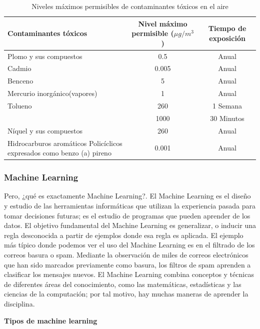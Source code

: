 \begin{table}[h]
	\begin{center}
		\begin{tabular}{| p{4cm} | c | c |}
			\hline
			\rowcolor{lightgray}
			Contaminantes tóxicos 			& Nivel máximo permisible ($ \mu g/m^3 $) 	& Tiempo de exposición	\\ \hline
			Plomo y sus compuestos			& 0.5 		& Anual		\\ \hline
			Cadmio							& 0.005 	& Anual 	\\ \hline
			Benceno							& 5 		& Anual		\\ \hline
			Mercurio inorgánico(vapores)	& 1 		& Anual		\\ \hline
			Tolueno							& 260 		& 1 Semana 	\\ 
											& 1000 		& 30 Minutos\\ \hline
			Níquel y sus compuestos			& 260 		& Anual 	\\ \hline
			Hidrocarburos aromáticos Policíclicos expresados como benzo (a) pireno	& 0.001	& Anual 	\\ \hline
		\end{tabular}
		\caption{Niveles máximos permisibles de contaminantes tóxicos en el aire}
	\end{center}
\end{table}

\subsubsection{Machine Learning}

Pero, ¿qué es exactamente Machine Learning?. El Machine Learning es el diseño y estudio de las herramientas informáticas que utilizan la experiencia pasada para tomar decisiones futuras; es el estudio de programas que pueden aprender de los datos. El objetivo fundamental del Machine Learning es generalizar, o inducir una regla desconocida a partir de ejemplos donde esa regla es aplicada. El ejemplo más típico donde podemos ver el uso del Machine Learning es en el filtrado de los correos basura o spam. Mediante la observación de miles de correos electrónicos que han sido marcados previamente como basura, los filtros de spam aprenden a clasificar los mensajes nuevos. El Machine Learning combina conceptos y técnicas de diferentes áreas del conocimiento, como las matemáticas, estadísticas y las ciencias de la computación; por tal motivo, hay muchas maneras de aprender la disciplina.

\textbf{Tipos de machine learning}


